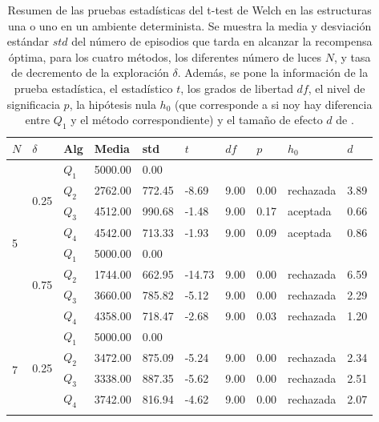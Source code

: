 \begin{table}[]
\centering
\caption{Resumen de las pruebas estadísticas del t-test de Welch en las
estructuras una o uno en un ambiente determinista. Se muestra la media y desviación estándar $std$ del número 
de episodios que tarda en alcanzar la recompensa óptima, para los cuatro métodos, los diferentes número de luces $N$, y tasa de decremento de la exploración $\delta$. Además, se pone la información
de la prueba estadística, el estadístico $t$, los grados de libertad $df$, el nivel
de significacia $p$, la hipótesis nula $h_0$ (que corresponde a si noy hay diferencia entre $Q_1$ y el método correspondiente) y el tamaño de efecto $d$ de \citet{cohen2013statistical}.}
\label{tab:one-to-one-delta-det}
\begin{tabular}{|l|l|l|l|l|l|l|l|l|l|}
\hline
$N$ & $\delta$ & Alg & Media & std & $t$ & $df$ & $p$ & $h_0$ & $d$ \\ \hline
\multirow{8}{*}{5} & \multirow{4}{*}{0.25} & $Q_1$ & 5000.00 & 0.00 & \multicolumn{5}{l|}{} \\ \cline{3-10} 
 &  & $Q_2$ & 2762.00 & 772.45 & -8.69 & 9.00 & 0.00 & rechazada & 3.89 \\ \cline{3-10} 
 &  & $Q_3$ & 4512.00 & 990.68 & -1.48 & 9.00 & 0.17 & aceptada & 0.66 \\ \cline{3-10} 
 &  & $Q_4$ & 4542.00 & 713.33 & -1.93 & 9.00 & 0.09 & aceptada & 0.86 \\ \cline{2-10} 
 & \multirow{4}{*}{0.75} & $Q_1$ & 5000.00 & 0.00 & \multicolumn{5}{l|}{} \\ \cline{3-10} 
 &  & $Q_2$ & 1744.00 & 662.95 & -14.73 & 9.00 & 0.00 & rechazada & 6.59 \\ \cline{3-10} 
 &  & $Q_3$ & 3660.00 & 785.82 & -5.12 & 9.00 & 0.00 & rechazada & 2.29 \\ \cline{3-10} 
 &  & $Q_4$ & 4358.00 & 718.47 & -2.68 & 9.00 & 0.03 & rechazada & 1.20 \\ \hline
\multirow{8}{*}{7} & \multirow{4}{*}{0.25} & $Q_1$ & 5000.00 & 0.00 & \multicolumn{5}{l|}{} \\ \cline{3-10} 
 &  & $Q_2$ & 3472.00 & 875.09 & -5.24 & 9.00 & 0.00 & rechazada & 2.34 \\ \cline{3-10} 
 &  & $Q_3$ & 3338.00 & 887.35 & -5.62 & 9.00 & 0.00 & rechazada & 2.51 \\ \cline{3-10} 
 &  & $Q_4$ & 3742.00 & 816.94 & -4.62 & 9.00 & 0.00 & rechazada & 2.07 \\ \cline{2-10} 

\end{tabular}
\end{table}
